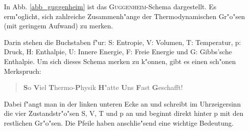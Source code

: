 In Abb. \ref{abb_guggenheim} ist das \textsc{Guggenheim}-Schema dargestellt. Es erm"oglicht, sich
zahlreiche Zusammenh"ange der Thermodynamischen Gr"o"sen (mit geringem
Aufwand) zu merken.

Darin stehen die Buchstaben f"ur: S: Entropie, V: Volumen, T:
Temperatur, p: Druck, H: Enthalpie, U: Innere Energie, F: Freie
Energie und G: Gibbs'sche Enthalpie. Um sich dieses Schema merken zu
k"onnen, gibt es einen sch"onen Merkspruch:
\begin{quote}
   \textbf{S}o \textbf{V}iel \textbf{T}hermo-\textbf{P}hysik
   \textbf{H}"atte \textbf{U}ns \textbf{F}ast \textbf{G}eschafft!
\end{quote}
Dabei f"angt man in der linken unteren Ecke an und schreibt im
Uhrzeigersinn die vier Zustandstr"o"sen S, V, T und p an und beginnt
direkt hinter p mit den restlichen Gr"o"sen. Die Pfeile haben
anschlie"send eine wichtige Bedeutung.

